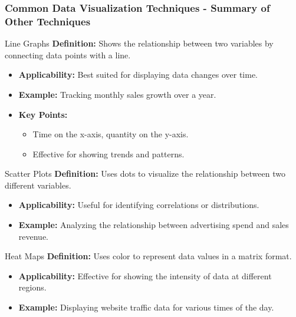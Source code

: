 \documentclass[aspectratio=169]{beamer}
\begin{document}
\begin{frame}[fragile]
    \frametitle{Common Data Visualization Techniques - Summary of Other Techniques}
    \begin{block}{Line Graphs}
        \textbf{Definition:} Shows the relationship between two variables by connecting data points with a line.
    \end{block}
    \begin{itemize}
        \item \textbf{Applicability:} Best suited for displaying data changes over time.
        \item \textbf{Example:} Tracking monthly sales growth over a year.
        \item \textbf{Key Points:}
        \begin{itemize}
            \item Time on the x-axis, quantity on the y-axis.
            \item Effective for showing trends and patterns.
        \end{itemize}
    \end{itemize}
    
    \begin{block}{Scatter Plots}
        \textbf{Definition:} Uses dots to visualize the relationship between two different variables.
    \end{block}
    \begin{itemize}
        \item \textbf{Applicability:} Useful for identifying correlations or distributions.
        \item \textbf{Example:} Analyzing the relationship between advertising spend and sales revenue.
    \end{itemize}
    
    \begin{block}{Heat Maps}
        \textbf{Definition:} Uses color to represent data values in a matrix format.
    \end{block}
    \begin{itemize}
        \item \textbf{Applicability:} Effective for showing the intensity of data at different regions.
        \item \textbf{Example:} Displaying website traffic data for various times of the day.
    \end{itemize}
\end{frame}
\end{document}
